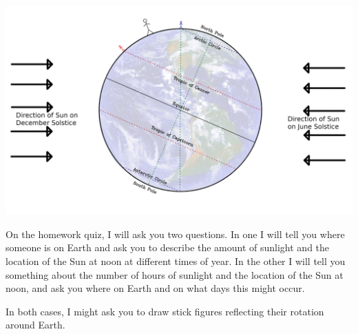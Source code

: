 \documentclass[12pt]{article}
\begin{document}
\newpage
\begin{landscape}
	
	\includegraphics[width=9.5in]{earth-diagram-both.png}
	
\small	On the homework quiz, I will ask you two questions. In one I will tell you where someone is on Earth and ask you to describe the amount of sunlight and the location of the Sun at noon at different times of year. In the other I will tell you something about the number of hours of sunlight and the location of the Sun at noon, and ask you where on Earth and on what days this might occur.
	
	In both cases, I might ask you to draw stick figures reflecting their rotation around Earth.

	
\end{landscape}

	
\end{document}
